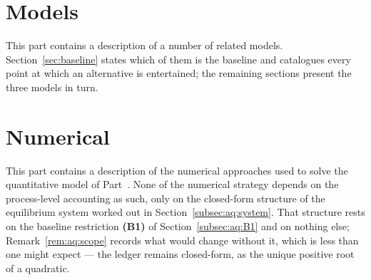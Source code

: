 \documentclass[a4paper]{article}
\begin{document}


\clearpage
\part{Models}\label{part:models}


This part contains a description of a number of related models. Section~\ref{sec:baseline} states which of them is the baseline and catalogues every point at which an alternative is entertained; the remaining sections present the three models in turn.






\clearpage
\part{Numerical}\label{part:num}

This part contains a description of the numerical approaches used to solve the quantitative model of Part~\ref{part:models}. None of the numerical strategy depends on the process-level accounting as such, only on the closed-form structure of the equilibrium system worked out in Section~\ref{subsec:aq:system}. That structure rests on the baseline restriction \textbf{(B1)} of Section~\ref{subsec:aq:B1} and on nothing else; Remark~\ref{rem:aq:scope} records what would change without it, which is less than one might expect --- the ledger remains closed-form, as the unique positive root of a quadratic.





\end{document}
